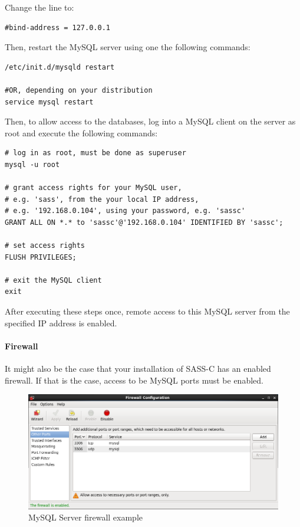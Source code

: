 Change the line to:

\begin{verbatim}
#bind-address = 127.0.0.1
\end{verbatim}

Then, restart the MySQL server using one the following commands:

\begin{verbatim}
/etc/init.d/mysqld restart

#OR, depending on your distribution
service mysql restart
\end{verbatim}

Then, to allow access to the databases, log into a MySQL client on the server as root and execute the following commands:

\begin{verbatim}
# log in as root, must be done as superuser
mysql -u root

# grant access rights for your MySQL user, 
# e.g. 'sass', from the your local IP address, 
# e.g. '192.168.0.104', using your password, e.g. 'sassc'
GRANT ALL ON *.* to 'sassc'@'192.168.0.104' IDENTIFIED BY 'sassc';

# set access rights
FLUSH PRIVILEGES;

# exit the MySQL client
exit
\end{verbatim}

After executing these steps once, remote access to this MySQL server from the specified IP address is enabled.

\paragraph{Firewall}

It might also be the case that your installation of SASS-C has an enabled firewall. If that is the case, access to be MySQL ports must be enabled.

\begin{figure}[H]
  \center
    \includegraphics[width=15cm,frame]{../screenshots/centos_firewall.png}
  \caption{MySQL Server firewall example}
\end{figure}

